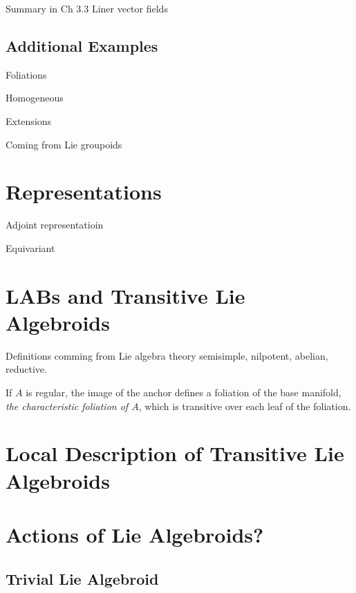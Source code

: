 Summary in Ch 3.3 Liner vector fields

\subsection{Additional Examples}

Foliations

Homogeneous

Extensions

Coming from Lie groupoids

\section{Representations}

Adjoint representatioin

Equivariant
\section{LABs and Transitive Lie Algebroids}

Definitions comming from Lie algebra theory semisimple, nilpotent, abelian, reductive.

If $A$ is regular, the image of the anchor defines a foliation of the base manifold, \emph{the characteristic foliation of $A$}, which is transitive over each leaf of the foliation.

\section{Local Description of Transitive Lie Algebroids}

\section{Actions of Lie Algebroids?}\subsection{Trivial Lie Algebroid}
